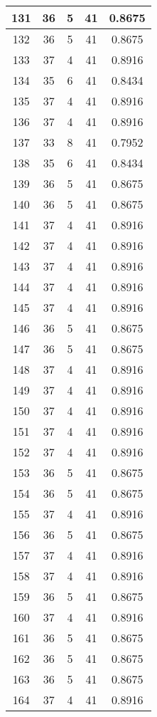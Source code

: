 \documentclass[letterpaper, 12pt]{article}
\begin{document}
\begin{longtable}{|c|c|c|c|c|}
\hline
131 & 36 & 5 & 41 & 0.8675 \\
\hline
132 & 36 & 5 & 41 & 0.8675 \\
\hline
133 & 37 & 4 & 41 & 0.8916 \\
\hline
134 & 35 & 6 & 41 & 0.8434 \\
\hline
135 & 37 & 4 & 41 & 0.8916 \\
\hline
136 & 37 & 4 & 41 & 0.8916 \\
\hline
137 & 33 & 8 & 41 & 0.7952 \\
\hline
138 & 35 & 6 & 41 & 0.8434 \\
\hline
139 & 36 & 5 & 41 & 0.8675 \\
\hline
140 & 36 & 5 & 41 & 0.8675 \\
\hline
141 & 37 & 4 & 41 & 0.8916 \\
\hline
142 & 37 & 4 & 41 & 0.8916 \\
\hline
143 & 37 & 4 & 41 & 0.8916 \\
\hline
144 & 37 & 4 & 41 & 0.8916 \\
\hline
145 & 37 & 4 & 41 & 0.8916 \\
\hline
146 & 36 & 5 & 41 & 0.8675 \\
\hline
147 & 36 & 5 & 41 & 0.8675 \\
\hline
148 & 37 & 4 & 41 & 0.8916 \\
\hline
149 & 37 & 4 & 41 & 0.8916 \\
\hline
150 & 37 & 4 & 41 & 0.8916 \\
\hline
151 & 37 & 4 & 41 & 0.8916 \\
\hline
152 & 37 & 4 & 41 & 0.8916 \\
\hline
153 & 36 & 5 & 41 & 0.8675 \\
\hline
154 & 36 & 5 & 41 & 0.8675 \\
\hline
155 & 37 & 4 & 41 & 0.8916 \\
\hline
156 & 36 & 5 & 41 & 0.8675 \\
\hline
157 & 37 & 4 & 41 & 0.8916 \\
\hline
158 & 37 & 4 & 41 & 0.8916 \\
\hline
159 & 36 & 5 & 41 & 0.8675 \\
\hline
160 & 37 & 4 & 41 & 0.8916 \\
\hline
161 & 36 & 5 & 41 & 0.8675 \\
\hline
162 & 36 & 5 & 41 & 0.8675 \\
\hline
163 & 36 & 5 & 41 & 0.8675 \\
\hline
164 & 37 & 4 & 41 & 0.8916 \\

\end{longtable}
\end{document}
